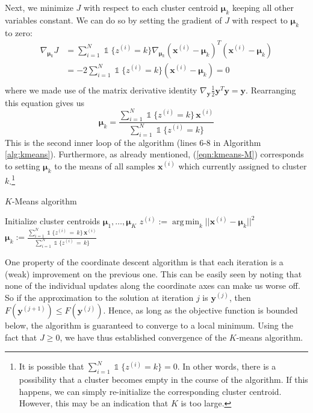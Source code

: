 \documentclass[final,3p,times,twocolumn]{elsarticle}
\DeclareMathOperator*{\argmin}{arg\,min}
\let\bs\boldsymbol
\DeclareMathOperator*{\id}{\mathds{1}}
\begin{document}
Next, we minimize $J$ with respect to each cluster centroid $\bs\mu_k$ keeping all other variables constant.
We can do so by setting the gradient of $J$ with respect to $\bs\mu_k$ to zero:
\begin{equation*}
\begin{split}
\nabla_{\bs\mu_k} J &= \sum_{i=1}^N\id\{z^{(i)}=k\}\nabla_{\bs\mu_k} (\bs x^{(i)}-\bs\mu_k)^T(\bs x^{(i)}-\bs\mu_k)\\
&= -2 \sum_{i=1}^N\id\{z^{(i)}=k\}(\bs x^{(i)}-\bs\mu_k) = 0\\
\end{split}
\end{equation*}
where we made use of the matrix derivative identity $\nabla_{\bs y}\frac{1}{2}\bs y^T \bs y = \bs y$.
Rearranging this equation gives us
\begin{equation}
\label{eqn:kmeans-M}
\bs\mu_k = \frac{\sum_{i=1}^N\id\{z^{(i)} = k\}\,\bs x^{(i)}}{\sum_{i=1}^N\id\{z^{(i)}=k\}}
\end{equation}
This is the second inner loop of the algorithm (lines 6-8 in Algorithm \ref{alg:kmeans}).
Furthermore, as already mentioned, (\ref{eqn:kmeans-M}) corresponds to setting $\bs \mu_k$ to the means of all samples $\bs x^{(i)}$ which currently assigned to cluster $k$.\footnote{It is possible that $\sum_{i=1}^N\id\{z^{(i)}=k\} = 0$.
In other words, there is a possibility that a cluster becomes empty in the course of the algorithm.
If this happens, we can simply re-initialize the corresponding cluster centroid.
However, this may be an indication that $K$ is too large.}

\begin{algorithm}
\caption{$K$-Means algorithm}
\label{alg:kmeans}
\begin{algorithmic}[1]
\State Initialize cluster centroids $\bs\mu_1,\dots,\bs\mu_K$
\Statex
\Repeat
{}
\State $z^{(i)} := \argmin_k ||\bs x^{(i)} - \bs\mu_k||^2$
\EndFor
\Statex
{}
\State $\bs\mu_k := \frac{\sum_{i=1}^N \id \{z^{(i)}\,=\,k\}\, \bs x^{(i)}}{\sum_{i=1}^N \id\{z^{(i)}\,=\,k\}}$
\EndFor
{}
\Statex\State\Return{$z^{(1)}, \dots, z^{(N)}, \bs\mu_1, \dots, \bs\mu_K$}
\end{algorithmic}
\end{algorithm}

One property of the coordinate descent algorithm is that each iteration is a (weak) improvement on the previous one.
This can be easily seen by noting that none of the individual updates along the coordinate axes can make us worse off. 
So if the approximation to the solution at iteration $j$ is $\bs y^{(j)}$, then $F(\bs y^{(j+1)}) \leq F(\bs y^{(j)})$.
Hence, as long as the objective function is bounded below, the algorithm is guaranteed to converge to a local minimum.
Using the fact that $J \geq 0$, we have thus established convergence of the $K$-means algorithm.
\end{document}
